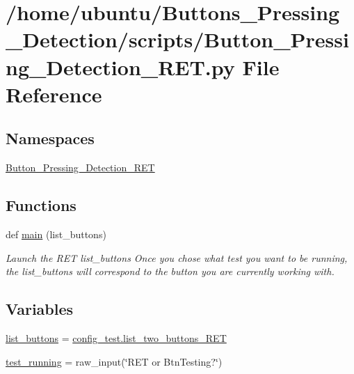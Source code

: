 \hypertarget{a00011}{}\section{/home/ubuntu/\+Buttons\+\_\+\+Pressing\+\_\+\+Detection/scripts/\+Button\+\_\+\+Pressing\+\_\+\+Detection\+\_\+\+R\+ET.py File Reference}
\label{a00011}
\subsection*{Namespaces}
\begin{DoxyCompactItemize}
\item 
 \hyperlink{a00023}{Button\+\_\+\+Pressing\+\_\+\+Detection\+\_\+\+R\+ET}
\end{DoxyCompactItemize}
\subsection*{Functions}
\begin{DoxyCompactItemize}
\item 
def \hyperlink{a00023_aa89deed443742aced73418959c6b3465}{main} (list\+\_\+buttons)
\begin{DoxyCompactList}\small\item\em Launch the R\+ET  list\+\_\+buttons Once you chose what test you want to be running, the list\+\_\+buttons will correspond to the button you are currently working with. \end{DoxyCompactList}\end{DoxyCompactItemize}
\subsection*{Variables}
\begin{DoxyCompactItemize}
\item 
\hyperlink{a00023_a50ea04db981a8afa82086a60a58ae466}{list\+\_\+buttons} = \hyperlink{a00025_aceb7d96541943b4a77c54516a2be88d2}{config\+\_\+test.\+list\+\_\+two\+\_\+buttons\+\_\+\+R\+ET}
\item 
\hyperlink{a00023_ad6dd5511fc0d9b712fc3f74e188a7cb8}{test\+\_\+running} = raw\+\_\+input(\char`\"{}R\+ET or Btn\+Testing?\char`\"{})
\end{DoxyCompactItemize}
